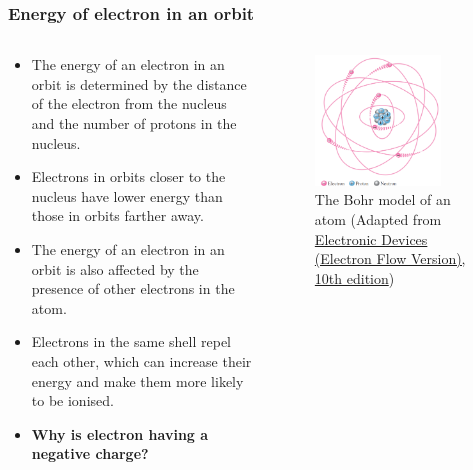 \begin{frame}
	\frametitle{Energy of electron in an orbit}
    \begin{columns}
        \begin{column}{0.6\textwidth}
            \begin{itemize}
                \item The energy of an electron in an orbit is determined by the distance of the electron from the nucleus and the number of protons in the nucleus.
                \item Electrons in orbits closer to the nucleus have lower energy than those in orbits farther away.
                \item The energy of an electron in an orbit is also affected by the presence of other electrons in the atom.
                \item Electrons in the same shell repel each other, which can increase their energy and make them more likely to be ionised.
                \item \textbf{Why is electron having a negative charge?}
            \end{itemize}
        \end{column}
        \hfill
        \begin{column}{0.4\textwidth}
            \begin{figure}
                \centering
                \includegraphics[width=0.8\textwidth]{fig/lec02/Atom_model.png}
                \caption{The Bohr model of an atom (Adapted from \href{https://www.pearson.com/en-us/subject-catalog/p/electronic-devices-electron-flow-version/P200000001048/9780137556755}{Electronic Devices (Electron Flow Version), 10th edition})}
            \end{figure}
        \end{column}
        \end{columns}
\end{frame}

